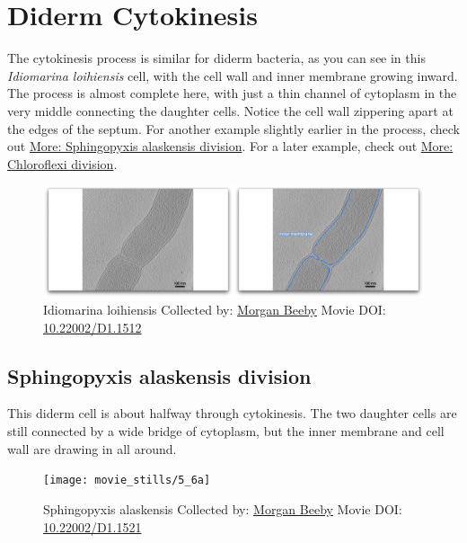 \documentclass[]{tufte-book}
\begin{document}
\section{Diderm Cytokinesis}\label{diderm-cytokinesis}

The cytokinesis process is similar for diderm bacteria, as you can see
in this \emph{Idiomarina loihiensis} cell, with the cell wall and inner
membrane growing inward. The process is almost complete here, with just
a thin channel of cytoplasm in the very middle connecting the daughter
cells. Notice the cell wall zippering apart at the edges of the septum.
For another example slightly earlier in the process, check out
\protect\hyperlink{Sphingopyxis_alaskensis_division}{More: Sphingopyxis
alaskensis division}. For a later example, check out
\protect\hyperlink{Chloroflexi_division}{More: Chloroflexi division}.





\begin{figure}
\includegraphics{movie_stills/5_6} \caption[Idiomarina loihiensis Collected by:
\protect\hyperlink{morgan_beeby}{Morgan Beeby} Movie DOI:
\href{https://doi.org/10.22002/D1.1512}{10.22002/D1.1512}]{Idiomarina loihiensis Collected by:
\protect\hyperlink{morgan_beeby}{Morgan Beeby} Movie DOI:
\href{https://doi.org/10.22002/D1.1512}{10.22002/D1.1512}}\label{fig:5-6}
\end{figure}

\hypertarget{Sphingopyxis_alaskensis_division}{\subsection{Sphingopyxis
alaskensis division}\label{Sphingopyxis_alaskensis_division}}

This diderm cell is about halfway through cytokinesis. The two daughter
cells are still connected by a wide bridge of cytoplasm, but the inner
membrane and cell wall are drawing in all around.





\begin{figure}
\texttt{[image: movie\_stills/5\_6a]} \caption[Sphingopyxis alaskensis Collected by:
\protect\hyperlink{morgan_beeby}{Morgan Beeby} Movie DOI:
\href{https://doi.org/10.22002/D1.1521}{10.22002/D1.1521}]{Sphingopyxis alaskensis Collected by:
\protect\hyperlink{morgan_beeby}{Morgan Beeby} Movie DOI:
\href{https://doi.org/10.22002/D1.1521}{10.22002/D1.1521}}\label{fig:5-6a}
\end{figure}
\end{document}

